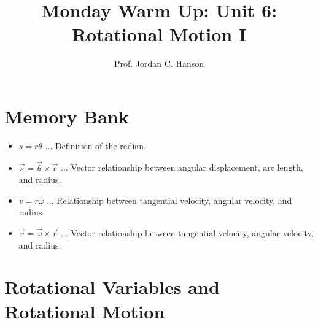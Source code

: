 \documentclass{article}
\begin{document}
\twocolumn

\title{Monday Warm Up: Unit 6: Rotational Motion I}
\author{Prof. Jordan C. Hanson}

\maketitle

\section{Memory Bank}

\begin{itemize}
\item $s = r \theta$ ... Definition of the radian.
\item $\vec{s} = \vec{\theta} \times \vec{r}$ ... Vector relationship between angular displacement, arc length, and radius.
\item $v = r \omega$ ... Relationship between tangential velocity, angular velocity, and radius.
\item $\vec{v} = \vec{\omega} \times \vec{r}$ ... Vector relationship between tangential velocity, angular velocity, and radius.
\end{itemize}

\section{Rotational Variables and Rotational Motion}
\end{document}
